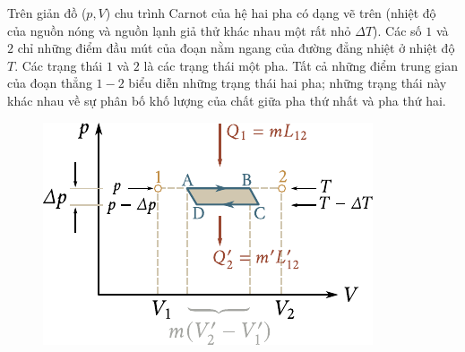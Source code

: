 Trên giản đồ ($p,V$) chu trình Carnot của hệ hai pha có dạng vẽ trên  (nhiệt độ của nguồn nóng và nguồn lạnh giả thử khác nhau một rất nhỏ $\Delta T$). Các số $1$ và $2$ chỉ những điểm đầu mút của đoạn nằm ngang của đường đẳng nhiệt ở nhiệt độ $T$. Các trạng thái $1$ và $2$ là các trạng thái một pha. Tất cả những điểm trung gian của đoạn thẳng $1-2$ biểu diễn những trạng thái hai pha; những trạng thái này khác nhau về sự phân bố khố lượng của chất giữa pha thứ nhất và pha thứ hai.\\

\begin{figure}[!htb]
	\begin{center}
		\includegraphics[scale=1]{figures/ch_15/fig_15_15.pdf}
		\caption[]{}
		\label{fig:15_15}
	\end{center}
\end{figure}

